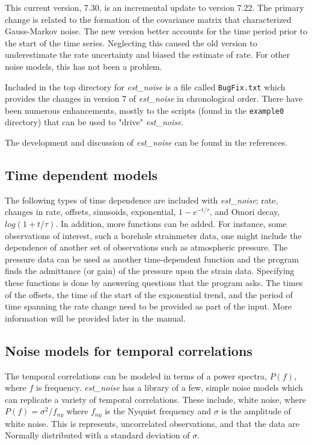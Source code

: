 \documentclass[12pt]{amsart}
\begin{document}
This current version, 7.30, is an incremental update to version 7.22.  The primary change is related to the formation of the
covariance matrix that characterized Gauss-Markov noise. The new version better accounts for the time period prior to the start
of the time series. Neglecting this caused the old version to underestimate the rate uncertainty and biased the estimate of rate.
For other noise models, this has not been a problem.

Included in the top directory for \textit{est\_noise} is a file called \texttt{BugFix.txt} which provides the changes in version 7 of  \textit{est\_noise} in
chronological order.  There have been numerous enhancements, mostly to the scripts (found in the \texttt{example0} directory)
that can be used to "drive" \textit{est\_noise}.

The development and discussion of \textit{est\_noise} can be found in the references. 

\subsection{Time dependent models}

The following types of time dependence are included with \textit{est\_noise};  rate, changes in rate, offsets, sinusoids,
exponential, $1-e^{-t/{\tau}}$, and Omori decay, $log(1 + t/{\tau})$. In addition, more functions can be added.  For instance,
some observations of interest, such a borehole strainmeter data, one might include the dependence of another set of observations such as atmospheric pressure. The pressure data can be used as another time-dependent function and the
program finds the admittance (or gain) of the pressure upon the strain data. Specifying these functions is done by answering
questions that the program asks. The times of the offsets, the time of the start of the exponential trend,
and the period of time spanning the rate change need to be provided as part of the input.  
More information will be provided later in the manual.

\subsection{Noise models for temporal correlations}

The temporal correlations can be modeled in terms of a power spectra, $P(f)$, where $f$ is frequency. \textit{est\_noise}
has a library of a few, simple noise models which can replicate a variety of temporal correlations. These include,
white noise, where $P(f)={\sigma^2}/f_{ny}$ where $f_{ny}$ is the Nyquist frequency and $\sigma$ is the amplitude
of white noise.  This is represents, uncorrelated observations, and that the data are Normally distributed with a standard
deviation of  $\sigma$.
\end{document}
